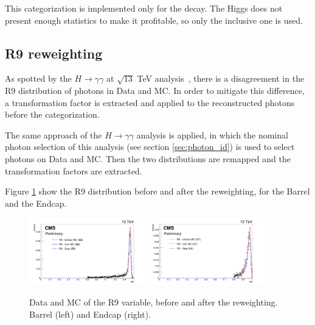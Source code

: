 This categorization is implemented only for the \Z decay. The Higgs does not present enough statistics to make it profitable, so only the inclusive one is used. 

\subsection{R9 reweighting}

As spotted by the $H \rightarrow \gamma\gamma$ at $\sqrt{13}$ TeV analysis~\cite{higgs_gammagamma_PAPPER}, there is a disagreement in the R9 distribution of photons in Data and MC. In order to mitigate this difference, a transformation factor is extracted and applied to the reconstructed photons before the categorization.

The same approach of the $H \rightarrow \gamma\gamma$ analysis is applied, in which the nominal photon selection of this analysis (see section \ref{sec:photon_id}) is used to select photons on Data and MC. Then the two distributions are remapped and the transformation factors are extracted. 

Figure \ref{fig:r9_reweighting} show the R9 distribution before and after the reweighting, for the Barrel and the Endcap.


\begin{figure}[!htbp]
\begin{center}
\includegraphics[width=0.45\textwidth]{figures_and_tables/R9/R9EB.png}\hspace*{1.cm}
\includegraphics[width=0.45\textwidth]{figures_and_tables/R9/R9EE.png}
\end{center}\vspace*{-.5cm}
\caption{Data and MC of the R9 variable, before and after the reweighting. Barrel (left) and Endcap (right).}
\label{fig:r9_reweighting}
\end{figure}

